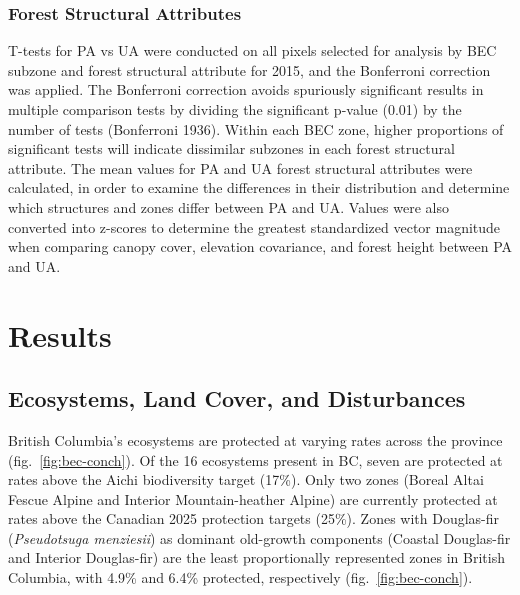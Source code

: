 \documentclass[11pt]{article}
\begin{document}
\hypertarget{forest-structural-attributes}{%
\subsubsection{Forest Structural
Attributes}\label{forest-structural-attributes}}

T-tests for PA vs UA were conducted on all pixels selected for analysis
by BEC subzone and forest structural attribute for 2015, and the
Bonferroni correction was applied. The Bonferroni correction avoids
spuriously significant results in multiple comparison tests by dividing
the significant p-value (0.01) by the number of tests (Bonferroni 1936).
Within each BEC zone, higher proportions of significant tests will
indicate dissimilar subzones in each forest structural attribute. The
mean values for PA and UA forest structural attributes were calculated,
in order to examine the differences in their distribution and determine
which structures and zones differ between PA and UA. Values were also
converted into z-scores to determine the greatest standardized vector
magnitude when comparing canopy cover, elevation covariance, and forest
height between PA and UA.

\hypertarget{results}{%
\section{Results}\label{results}}

\hypertarget{ecosystems-land-cover-and-disturbances-1}{%
\subsection{Ecosystems, Land Cover, and
Disturbances}\label{ecosystems-land-cover-and-disturbances-1}}

British Columbia's ecosystems are protected at varying rates across the
province (fig.~\ref{fig:bec-conch}). Of the 16 ecosystems present in BC,
seven are protected at rates above the Aichi biodiversity target (17\%).
Only two zones (Boreal Altai Fescue Alpine and Interior Mountain-heather
Alpine) are currently protected at rates above the Canadian 2025
protection targets (25\%). Zones with Douglas-fir (\emph{Pseudotsuga
menziesii}) as dominant old-growth components (Coastal Douglas-fir and
Interior Douglas-fir) are the least proportionally represented zones in
British Columbia, with 4.9\% and 6.4\% protected, respectively
(fig.~\ref{fig:bec-conch}).
\end{document}
